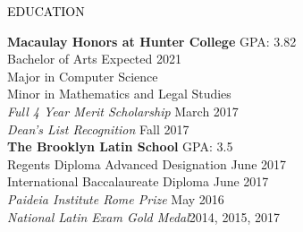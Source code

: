 \documentclass{resume} %
\renewenvironment{rSection}[1]{
  \sectionskip
  \textcolor{Black}{\MakeUppercase{#1}}
  \sectionlineskip
  \begin{list}{}{
      \setlength{\leftmargin}{1.5em}
    }
  \item[]
  }{
  \end{list}
}
\begin{document}
\begin{rSection}{Education}
  \begin{multicols}{2}
    {\bf Macaulay Honors at Hunter College} \hfill GPA: 3.82
    \\ Bachelor of Arts \hfill Expected 2021
    \\ Major in Computer Science
    \\ Minor in Mathematics and Legal Studies
    \\ {\em Full 4 Year Merit Scholarship} \hfill March 2017
    \\ {\em Dean's List Recognition } \hfill Fall 2017\columnbreak
    \\ {\bf The Brooklyn Latin School} \hfill GPA: 3.5
    \\ Regents Diploma Advanced Designation \hfill June 2017
    \\ International Baccalaureate Diploma \hfill June 2017
    \\ {\em Paideia Institute Rome Prize} \hfill May 2016
    \\ {\em National Latin Exam Gold Medal}\hfill 2014, 2015, 2017
  \end{multicols}
\end{rSection}
\end{document}
